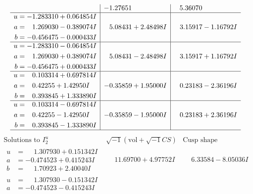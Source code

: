 \documentclass[1p]{elsarticle_modified}
\theoremstyle{definition}
\newcommand{\I}{\sqrt{-1}}
\begin{document}
$$\begin{array}{c|c|c}
 & -1.27651\phantom{ +0.000000I} & \phantom{-}5.36070\phantom{ +0.000000I} \\ \hline\begin{aligned}
u &= -1.283310 + 0.064854 I \\
a &= \phantom{-}1.269030 - 0.389074 I \\
b &= -0.456475 - 0.000433 I\end{aligned}
 & \phantom{-}5.08431 + 2.48498 I & \phantom{-}3.15917 - 1.16792 I \\ \hline\begin{aligned}
u &= -1.283310 - 0.064854 I \\
a &= \phantom{-}1.269030 + 0.389074 I \\
b &= -0.456475 + 0.000433 I\end{aligned}
 & \phantom{-}5.08431 - 2.48498 I & \phantom{-}3.15917 + 1.16792 I \\ \hline\begin{aligned}
u &= \phantom{-}0.103314 + 0.697814 I \\
a &= \phantom{-}0.42255 + 1.42950 I \\
b &= \phantom{-}0.393845 + 1.333890 I\end{aligned}
 & -0.35859 + 1.95000 I & \phantom{-}0.23183 - 2.36196 I \\ \hline\begin{aligned}
u &= \phantom{-}0.103314 - 0.697814 I \\
a &= \phantom{-}0.42255 - 1.42950 I \\
b &= \phantom{-}0.393845 - 1.333890 I\end{aligned}
 & -0.35859 - 1.95000 I & \phantom{-}0.23183 + 2.36196 I\\
 \hline 
 \end{array}$$\newpage$$\begin{array}{c|c|c}  
\text{Solutions to }I^u_{2}& \I (\text{vol} + \sqrt{-1}CS) & \text{Cusp shape}\\
 \hline 
\begin{aligned}
u &= \phantom{-}1.307930 + 0.151342 I \\
a &= -0.474523 + 0.415243 I \\
b &= \phantom{-}1.70923 + 2.40040 I\end{aligned}
 & \phantom{-}11.69700 + 4.97752 I & \phantom{-}6.33584 - 8.05036 I \\ \hline\begin{aligned}
u &= \phantom{-}1.307930 - 0.151342 I \\
a &= -0.474523 - 0.415243 I \\

\end{aligned}
\end{array}$$
\end{document}

